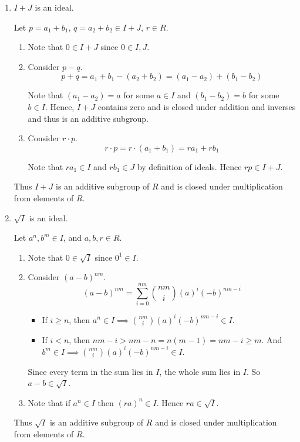 \documentclass[Notebook.tex]{subfiles}
\begin{document}
\begin{solution}
\begin{enumerate}[label=(\alph*),ref=\theenumi\alph*]
        \item $I + J$ is an ideal. 
        
        Let $p = a_1+b_1, \, q = a_2 + b_2 \in I + J$, $r \in R$.  

        \begin{enumerate}[label=(\roman*),ref=\theenumi\roman*]
            \item Note that $0 \in I + J$ since $0 \in I, J$. 
            \item Consider $p - q$. 
            \[p + q  = a_1+b_1 - (a_2 + b_2 ) = (a_1 - a_2) + (b_1 - b_2)\]

            Note that $(a_1 - a_2) = a$ for some $a\in I$  and $(b_1 - b_2) = b$ for some $b \in I$. Hence, $I + J$ contains zero and is closed under addition and inverses and thus is an additive subgroup. 

            \item Consider $r \cdot p$. 
            \[r \cdot p = r \cdot (a_1 + b_1) = r a_1 + r b_1\]

            Note that $ra_1 \in I$ and $rb_1 \in J$ by definition of ideals. Hence $rp \in I + J$. 
        \end{enumerate}
        Thus $I+J$ is an additive subgroup of $R$ and is closed under multiplication from elements of $R$. 

        \item $\sqrt{I}$ is an ideal. 
        
        Let $a^n, b^m \in I$, and $a, b, r \in R$.  

        \begin{enumerate}[label=(\roman*),ref=\theenumi\roman*]
            \item Note that $0 \in \sqrt{I}$ since $0^1 \in I$. 
            \item Consider $(a-b)^{nm}$. 
            \[(a-b)^{nm} = \sum_{i=0}^{nm} \binom{nm}{i}(a)^i(-b)^{nm-i}\]

            \begin{itemize}
                \item If $i \geq n$, then $a^n \in I \implies  \binom{nm}{i}(a)^i(-b)^{nm-i} \in I$. 
                \item If $i < n$, then $nm - i > nm -n = n(m-1) = nm - i \geq m$. 
                And $ b^{m} \in I \implies  \binom{nm}{i}(a)^i(-b)^{nm-i} \in I$. 
            \end{itemize}
            Since every term in the sum lies in $I$, the whole sum lies in $I$. So $a-b \in \sqrt{I}$.
            
            \item Note that if $a^n \in I$ then $(ra)^n \in I$. Hence $ra \in \sqrt{I}$. 
        \end{enumerate}
        Thus $\sqrt{I}$ is an additive subgroup of $R$ and is closed under multiplication from elements of $R$. 
    \end{enumerate}
\end{solution}
	
\end{document}
